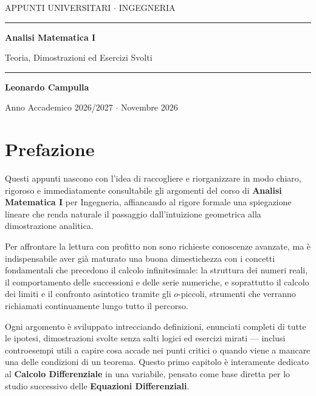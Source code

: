 \documentclass[a4paper, 10pt, openany]{book}
\begin{document}
\begin{titlepage}
    \centering
    \vspace*{3cm}
    {\color{accentcyan}\small\MakeUppercase{Appunti Universitari $\cdot$ Ingegneria}}
    \vspace{0.8cm}
    {\color{fglight!30}\rule{\linewidth}{0.5pt}}
    \vspace{0.8cm}
    {\Huge\bfseries\color{fglight} Analisi Matematica I \par}
    \vspace{0.4cm}
    {\Large\color{accentpurple} Teoria, Dimostrazioni ed Esercizi Svolti \par}
    \vspace{0.8cm}
    {\color{fglight!30}\rule{\linewidth}{0.5pt}}
    \vfill
    {\large\bfseries\color{fglight} Leonardo Campulla \par}
    \vspace{0.2cm}
    {\small\color{fglight!60} Anno Accademico 2026/2027 $\cdot$ Novembre 2026 \par}
    \vspace*{1cm}
\end{titlepage}

\frontmatter
\frontmatter
\chapter*{Prefazione}

Questi appunti nascono con l'idea di raccogliere e riorganizzare in modo chiaro, rigoroso e immediatamente consultabile gli argomenti del corso di \textbf{Analisi Matematica I} per Ingegneria, affiancando al rigore formale una spiegazione lineare che renda naturale il passaggio dall'intuizione geometrica alla dimostrazione analitica.

Per affrontare la lettura con profitto non sono richieste conoscenze avanzate, ma è indispensabile aver già maturato una buona dimestichezza con i concetti fondamentali che precedono il calcolo infinitesimale: la struttura dei numeri reali, il comportamento delle successioni e delle serie numeriche, e soprattutto il calcolo dei limiti e il confronto asintotico tramite gli $o$-piccoli, strumenti che verranno richiamati continuamente lungo tutto il percorso.

Ogni argomento è sviluppato intrecciando definizioni, enunciati completi di tutte le ipotesi, dimostrazioni svolte senza salti logici ed esercizi mirati — inclusi controesempi utili a capire cosa accade nei punti critici o quando viene a mancare una delle condizioni di un teorema. Questo primo capitolo è interamente dedicato al \textbf{Calcolo Differenziale} in una variabile, pensato come base diretta per lo studio successivo delle \textbf{Equazioni Differenziali}.
\end{document}
